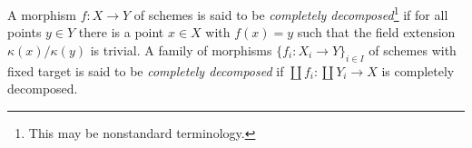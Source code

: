 \begin{definition}
\label{definition-cd-morphism}
A morphism $f : X \to Y$ of schemes is said to be
{\it completely decomposed}\footnote{This may be nonstandard terminology.}
if for all points $y \in Y$ there
is a point $x \in X$ with $f(x) = y$ such that the field
extension $\kappa(x)/\kappa(y)$ is trivial.
A family of morphisms $\{f_i : X_i \to Y\}_{i \in I}$ of
schemes with fixed target is said to be {\it completely decomposed}
if $\coprod f_i : \coprod Y_i \to X$ is completely decomposed.
\end{definition}